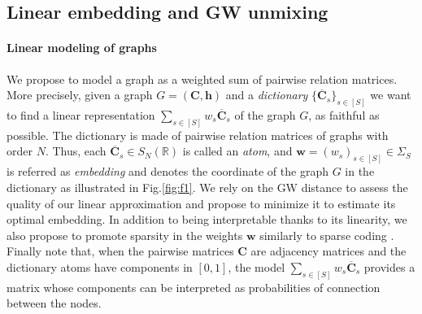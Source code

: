\documentclass{article}
\def\vh{{\bm{h}}}
\def\vw{{\bm{w}}}
\def\mC{{\bm{C}}}
\newcommand{\R}{\mathbb{R}}
\def\R{{\mathbb{R}}}
\begin{document}
	\subsection{Linear embedding and GW unmixing}\label{subsec:GU}
	
	\paragraph{Linear modeling of graphs} We propose to model a graph as a weighted sum of pairwise relation
	matrices. More precisely, given a graph $G=(\mC,\vh)$ and a \emph{dictionary}
	$\{\overline{\mC}_{s}\}_{s \in [S]}$ we want to find a linear representation $\sum_{s
		\in [S]} w_{s} \overline{\mC}_{s}$ of the graph $G$, as faithful as
	possible. The dictionary is made of pairwise relation matrices of graphs with
	order $N$. Thus, each $\overline{\mC}_{s} \in S_N(\R)$  is called an
	\emph{atom}, and $\vw=(w_{s})_{s \in [S]} \in \Sigma_S$ is referred as
	\emph{embedding} and denotes the coordinate of the graph $G$ in the dictionary
	as illustrated in Fig.\ref{fig:f1}. We rely
	on the GW distance to assess the quality of our linear
	approximation and propose to minimize it to estimate its optimal embedding. In
	addition to being interpretable thanks to its linearity, we also propose to promote
	sparsity in the weights $\vw$ similarly to sparse coding \citep{chen2001atomic}.
	Finally note that, when the pairwise matrices $\mC$ are adjacency matrices
	and the dictionary atoms have components in $[0,1]$, the model
	$\sum_{s \in [S]} w_{s} \overline{\mC}_{s}$ provides a matrix whose components
	can be interpreted as probabilities of connection between the nodes.
	
	
\end{document}
